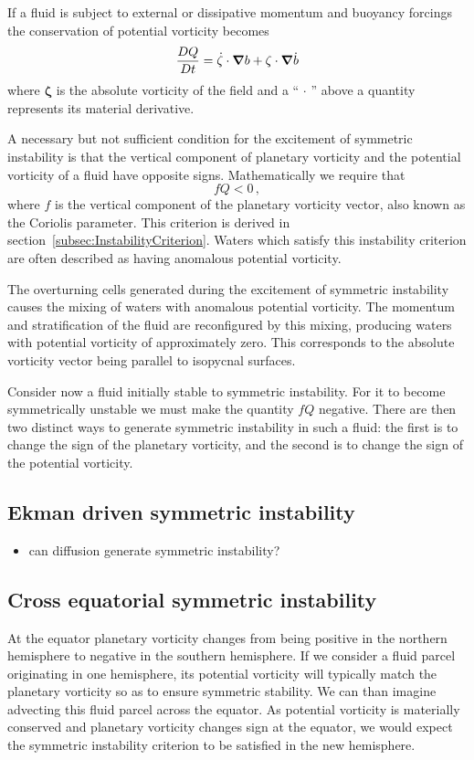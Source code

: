 If a fluid is subject to external or dissipative momentum and buoyancy forcings the conservation of potential vorticity  becomes
\begin{equation}
    \frac{DQ}{Dt} = \dot{\mathbf{\zeta}} \cdot  \grad{b} + \mathbf{\zeta} \cdot \grad{\dot{b}}
\end{equation}
where $\mathbf{\zeta}$ is the absolute vorticity of the field and a ``$\,\cdot{}\,$'' above a quantity represents its material derivative.

A necessary but not sufficient condition for the excitement of symmetric instability is that the vertical component of planetary vorticity and the potential vorticity of a fluid have opposite signs. Mathematically we require that
\begin{equation}
    \label{eq:PVConservation}
    f Q < 0 \, ,
\end{equation}
where $f$ is the vertical component of the planetary vorticity vector, also known as the Coriolis parameter. This criterion is derived in section~\ref{subsec:InstabilityCriterion}. Waters which satisfy this instability criterion are often described as having anomalous potential vorticity.

The overturning cells generated during the excitement of symmetric instability causes the mixing of waters with anomalous potential vorticity. The momentum and stratification of the fluid are reconfigured by this mixing, producing waters with potential  vorticity of approximately zero. This corresponds to the absolute vorticity vector being parallel to isopycnal surfaces.

Consider now a fluid initially stable to symmetric instability. For it to become symmetrically unstable we must make the quantity $fQ$ negative. There are then two distinct ways to generate symmetric instability in such a fluid: the first is to change the sign of the planetary vorticity, and the second is to change the sign of the potential vorticity.

\subsection{Ekman driven symmetric instability}
\begin{itemize}
    \item can diffusion generate symmetric instability?
\end{itemize}

\subsection{Cross equatorial symmetric instability}
At the equator planetary vorticity changes from being positive in the northern hemisphere to negative in the southern hemisphere. If we consider a fluid parcel originating in one hemisphere, its potential vorticity will typically match the planetary vorticity so as to ensure symmetric stability. We can than imagine advecting this fluid parcel across the equator. As potential vorticity is materially conserved and planetary vorticity changes sign at the equator, we would expect the symmetric instability criterion to be satisfied in the new hemisphere.

